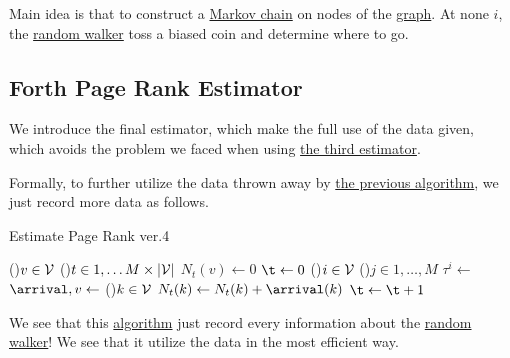 \begin{prev}
	Main idea is that to construct a \hyperref[def:Markov-chain]{Markov chain} on nodes of the \hyperref[def:graph]{graph}. At none \(i\), the
	\hyperref[def:random-walker]{random walker} toss a biased coin and determine where to go.
\end{prev}

\subsection{Forth Page Rank Estimator}
We introduce the final estimator, which make the full use of the data given, which avoids the problem we faced when using
\hyperref[subsec:third-page-rank-estimator]{the third estimator}.

Formally, to further utilize the data thrown away by \hyperref[algo:Monte-Carlo-algorithm-3]{the previous algorithm}, we just record more data as follows.
\par
\begin{algorithm}[H]\label{algo:Monte-Carlo-algorithm-4}
	\DontPrintSemicolon
	\caption{Estimate Page Rank ver.4}

	\BlankLine

	\For(){\(v\in \mathcal{\MakeUppercase{v}} \)}{
		\For(){\(t\in 1, \ldots M \times \left\vert \mathcal{\MakeUppercase{v}}  \right\vert  \)}{
			\(N_t(v)\gets 0\)\;
		}
	}
	\(\t\gets 0\)\;
	\;
	\For(){\(i\in \mathcal{\MakeUppercase{v}}\)}{
		\For(){\(j\in 1, \ldots, M\)}{
			\(\tau^i \gets \) 
			\(\arrival, v \gets\)
			\For(){\(k\in \mathcal{\MakeUppercase{v}} \)}{
				\(N_t(k)\gets N_t(k) + \arrival(k)\)\;
			}
			\(\t\gets \t + 1\)\;
		}
	}
	\;
\end{algorithm}
\begin{intuition}
	We see that this \hyperref[algo:Monte-Carlo-algorithm-4]{algorithm} just record every information about the \hyperref[def:random-walker]{random walker}!
	We see that it utilize the data in the most efficient way.
\end{intuition}

